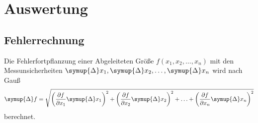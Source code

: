 \section{Auswertung}
\label{sec:Auswertung}
\subsection{Fehlerrechnung}
Die Fehlerfortpflanzung einer Abgeleiteten Größe $f(x_1,x_2,\ldots,x_n)$ mit den Messunsicherheiten $\symup{\Delta}x_1,\symup{\Delta}x_2,\ldots,\symup{\Delta}x_n$ wird nach Gauß
\begin{equation*}
  \symup{\Delta}f = \sqrt{\left(\frac{\partial f}{\partial x_1}\symup{\Delta}x_1\right)^2 + \left(\frac{\partial f}{\partial x_2}\symup{\Delta}x_2\right)^2 + \ldots + \left(\frac{\partial f}{\partial x_n}\symup{\Delta}x_n\right)^2}
\end{equation*}
berechnet.
